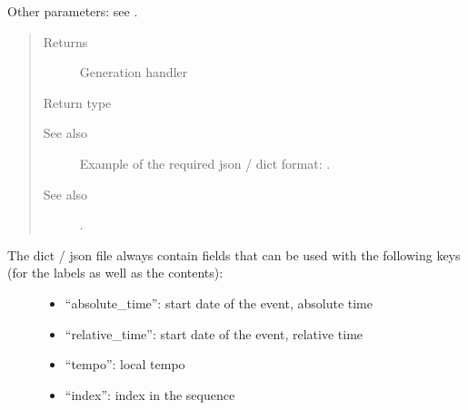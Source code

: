 \documentclass[letterpaper,10pt,english]{sphinxmanual}
\begin{document}
\begin{fulllineitems}
\begin{quote}
\begin{description}
\begin{itemize}
\end{itemize}

\end{description}\end{quote}

Other parameters: see {\hyperref[\detokenize{index:Generator.GenerationHandler}]{}}.
\begin{quote}\begin{description}
\item[{Returns}] \leavevmode
Generation handler

\item[{Return type}] \leavevmode
{\hyperref[\detokenize{index:Generator.GenerationHandler}]{}}

\item[{See also}] \leavevmode
Example of the required json / dict format: .

\item[{See also}] \leavevmode
{} .

\end{description}\end{quote}
\begin{description}
\item[{The dict / json file always contain fields that can be used with the following keys (for the labels as well as the contents):}] \leavevmode\begin{itemize}
\item {} 
“absolute\_time”: start date of the event, absolute time

\item {} 
“relative\_time”: start date of the event, relative time

\item {} 
“tempo”: local tempo

\item {} 
“index”: index in the sequence

\end{itemize}

\end{description}

\end{fulllineitems}

\end{document}
